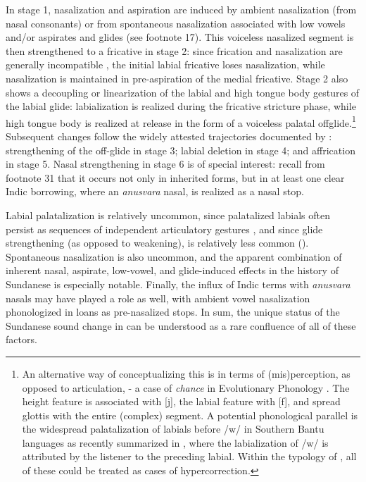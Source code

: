 \documentclass[output=paper]{langscibook}
\begin{document}
In stage 1, nasalization and aspiration are induced by ambient nasalization (from nasal consonants) or from spontaneous nasalization associated with low vowels and/or aspirates and glides (see footnote 17). This voiceless nasalized segment is then strengthened to a fricative in stage 2: since frication and nasalization are generally incompatible \citep{WarnerEtAl2015}, the initial labial fricative loses nasalization, while nasalization is maintained in pre-aspiration of the medial fricative. Stage 2 also shows a decoupling or linearization of the labial and high tongue body gestures of the labial glide: labialization is realized during the fricative stricture phase, while high tongue body is realized at release in the form of a voiceless palatal offglide.\footnote{An alternative way of conceptualizing this is in terms of (mis)perception, as opposed to articulation, - a case of \textit{chance} in Evolutionary Phonology \citep[32]{Blevins2004}. The height feature is associated with [j], the labial feature with [f], and spread glottis with the entire (complex) segment. A potential phonological parallel is the widespread palatalization of labials before \mbox{/w/} in Southern Bantu languages as recently summarized in \citet[2--4]{BennettBraver2020}, where the labialization of \mbox{/w/} is attributed by the listener to the preceding labial. Within the typology of \citet{Ohala1993}, all of these could be treated as cases of hypercorrection.}  Subsequent changes follow the widely attested trajectories documented by \citet{Bateman2010}: strengthening of the off-glide in stage 3; labial deletion in stage 4; and affrication in stage 5. Nasal strengthening in stage 6 is of special interest: recall from footnote 31 that it occurs not only in inherited forms, but in at least one clear Indic borrowing, where an \emph{anusvara} nasal, is realized as a nasal stop.

Labial palatalization is relatively uncommon, since palatalized labials often persist as sequences of independent articulatory gestures \citep{Bateman2010}, and since glide strengthening (as opposed to weakening), is relatively less common (\citealt{BybeeEasterday2019}). Spontaneous nasalization is also uncommon, and the apparent combination of inherent nasal, aspirate, low-vowel, and glide-induced effects in the history of Sundanese is especially notable. Finally, the influx of Indic terms with \textit{anusvara} nasals may have played a role as well, with ambient vowel nasalization phonologized in loans as pre-nasalized stops. In sum, the unique status of the Sundanese sound change in  can be understood as a rare confluence of all of these factors.
\end{document}
